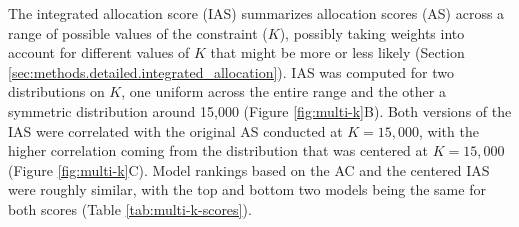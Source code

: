 \documentclass{article}\usepackage[]{graphicx}\usepackage[]{xcolor}
\begin{document}
The integrated allocation score (IAS) summarizes allocation scores (AS) across a range of possible values of the constraint ($K$), possibly taking weights into account for different values of $K$ that might be more or less likely (Section \ref{sec:methods.detailed.integrated_allocation}).
IAS was computed for two distributions on $K$, one uniform across the entire range and the other a symmetric distribution around 15,000 (Figure \ref{fig:multi-k}B).
Both versions of the IAS were correlated with the original AS conducted at $K=15,000$, with the higher correlation coming from the distribution that was centered at $K=15,000$ (Figure \ref{fig:multi-k}C).
Model rankings based on the AC and the centered IAS were roughly similar, with the top and bottom two models being the same for both scores (Table \ref{tab:multi-k-scores}).
\end{document}
